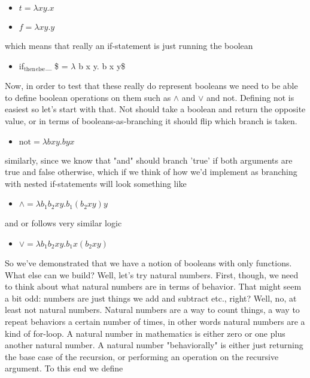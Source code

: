 \documentclass[11pt]{article}
\begin{document}
\begin{itemize}
\item $t = \lambda x y. x$
\item $f = \lambda x y. y$
\end{itemize}

which means that really an if-statement is just running the boolean

\begin{itemize}
\item if$_{\text{then}}$$_{\text{else}}$\_ \$ = $\lambda$ b x y. b x y\$
\end{itemize}

Now, in order to test that these really do represent booleans we need to be able to define boolean operations on them such as $\wedge$ and $\vee$ and not. Defining not is easiest so let's start with that. Not should take a boolean and return the opposite value, or in terms of booleans-as-branching it should flip which branch is taken. 

\begin{itemize}
\item $\text{not} = \lambda b x y. b y x$
\end{itemize}

similarly, since we know that "and" should branch 'true' if both arguments are true and false otherwise, which if we think of how we'd implement as branching with nested if-statements will look something like

\begin{itemize}
\item $\wedge = \lambda b_1 b_2 x y. b_1 (b_2 x y) y$
\end{itemize}

and or follows very similar logic

\begin{itemize}
\item $\vee = \lambda b_1 b_2 x y. b_1 x (b_2 x y)$
\end{itemize}

So we've demonstrated that we have a notion of booleans with only functions. What else can we build? Well, let's try natural numbers. First, though, we need to think about what natural numbers are in terms of behavior. That might seem a bit odd: numbers are just things we add and subtract etc., right? Well, no, at least not natural numbers. Natural numbers are a way to count things, a way to repeat behaviors a certain number of times, in other words natural numbers are a kind of for-loop. A natural number in mathematics is either zero or one plus another natural number. A natural number "behaviorally" is either just returning the base case of the recursion, or performing an operation on the recursive argument. To this end we define
\end{document}
